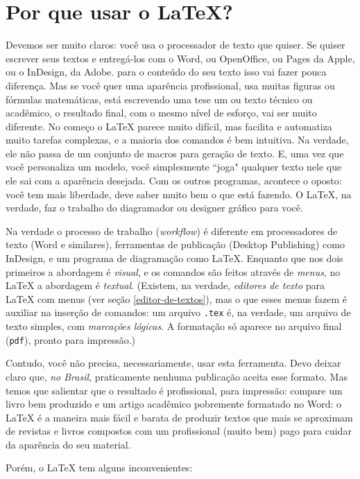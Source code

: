 \documentclass[a4paper,nols,bidi,nohyper,nobib]{tufte-book}
\begin{document}
\section{Por que usar o LaTeX?}

Devemos ser muito claros: você usa o processador de texto que quiser. Se quiser escrever seus textos e entregá-los com o Word, ou OpenOffice, ou Pages da Apple, ou o InDesign, da Adobe. para o conteúdo do seu texto isso vai fazer pouca diferença. Mas se você quer uma aparência profissional, usa muitas figuras ou fórmulas matemáticas, está escrevendo uma tese um ou texto técnico ou acadêmico, o resultado final, com o mesmo nível de esforço, vai ser muito diferente. No começo o \LaTeX{} parece muito difícil, mas facilita e automatiza muito tarefas complexas, e a maioria dos comandos é bem intuitiva. Na verdade, ele não passa de um conjunto de macros para geração de texto. E, uma vez que você personaliza um modelo, você simplesmente ``joga" qualquer texto nele que ele sai com a aparência desejada. Com os outros programas, acontece o oposto: você tem mais liberdade, deve saber muito bem o que está fazendo. O \LaTeX{}, na verdade, faz o trabalho do diagramador ou designer gráfico para você.

Na verdade o processo de trabalho (\textit{workflow}) é diferente em processadores de texto (Word e similares), ferramentas de publicação (Desktop Publishing) como InDesign, e um programa de diagramação como \LaTeX. Enquanto que nos dois primeiros a abordagem é \textit{visual}, e os comandos são feitos através de \textit{menus}, no \LaTeX{} a abordagem é \textit{textual}. (Existem, na verdade, \textit{editores de texto} para \LaTeX{} com menus (ver seção \ref{editor-de-textos}), mas o que esses menus fazem é auxiliar na inserção de comandos: um arquivo \texttt{.tex} é, na verdade, um arquivo de texto simples, com \textit{marcações lógicas}. A formatação só aparece no arquivo final (\texttt{pdf}), pronto para impressão.)

Contudo, você não precisa, necessariamente, usar esta ferramenta. Devo deixar claro que, \textit{no Brasil}, praticamente nenhuma publicação aceita esse formato. Mas temos que salientar que o resultado é profissional, para impressão: compare um livro bem produzido e um artigo acadêmico pobremente formatado no Word: o \LaTeX{} é a maneira mais fácil e barata de produzir textos que mais se aproximam de revistas e livros compostos com um profissional (muito bem) pago para cuidar da aparência do seu material. 

Porém, o \LaTeX{} tem alguns inconvenientes:
 
\end{document}
